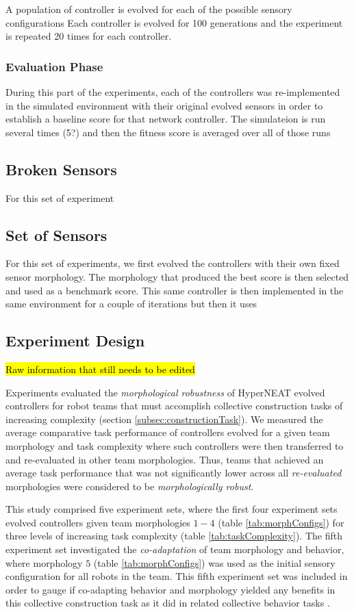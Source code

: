 \documentclass[conference]{IEEEtran}
\begin{document}
A population of controller is evolved for each of the possible sensory configurations
Each controller is evolved for 100 generations and the experiment is repeated 20 times for each controller.

\subsubsection{Evaluation Phase}
During this part of the experiments, each of the controllers was re-implemented in the simulated environment with their original evolved sensors in order to establish a baseline score for that network controller.
The simulateion is run several times (5?) and then the fitness score is averaged over all of those runs

\subsection{Broken Sensors}
For this set of experiment

\subsection{Set of Sensors}
For this set of experiments, we first evolved the controllers with their own fixed sensor morphology. The morphology that produced the best score is then selected and used as a benchmark score. This same controller is then implemented in the same environment for a couple of iterations but then it uses

\subsection{Experiment Design}\label{subsec:expDesign}

\hl{Raw information that still needs to be edited}

Experiments evaluated the \textit{morphological robustness} of HyperNEAT evolved controllers for
robot teams that must accomplish collective construction tasks of increasing
complexity (section \ref{subsec:constructionTask}).
We measured the average comparative task performance of controllers evolved
for a given team morphology and task complexity where such controllers were
then transferred to
and re-evaluated in other team morphologies.
Thus, teams that achieved an average task performance that was not significantly lower
across all \textit{re-evaluated} morphologies were considered to be \textit{morphologically robust}.

This study comprised five experiment sets, where the first four experiment sets evolved
controllers given team morphologies $1-4$ (table \ref{tab:morphConfigs})
for three levels of increasing task complexity (table \ref{tab:taskComplexity}).
The fifth experiment set investigated the \textit{co-adaptation} of team morphology
and behavior, where morphology $5$ (table \ref{tab:morphConfigs}) was used
as the initial sensory configuration for all robots in the team.
This fifth experiment set was included in order to gauge if co-adapting behavior
and morphology yielded any benefits in this collective construction task as it did in related
collective behavior tasks \cite{HewlandNitschke2015}.
\end{document}
